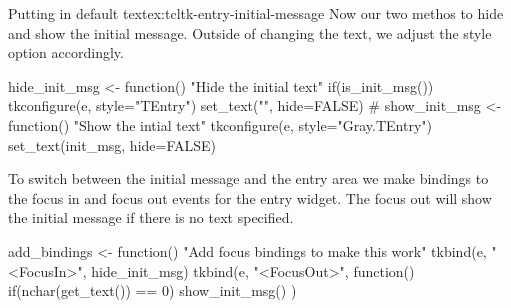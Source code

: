 \begin{example}{Putting in default text}{ex:tcltk-entry-initial-message}
Now our two methos to hide and show the initial message. Outside of
changing the text, we adjust the style option accordingly.
\begin{Schunk}
\begin{Sinput}
 hide_init_msg <- function() {
   "Hide the initial text"
   if(is_init_msg()) {
     tkconfigure(e, style="TEntry")
     set_text("", hide=FALSE)
   }
 }
 #
 show_init_msg <- function() {
   "Show the intial text"
   tkconfigure(e, style="Gray.TEntry")
   set_text(init_msg, hide=FALSE)
 }
\end{Sinput}
\end{Schunk}

To switch between the initial message and the entry area we make
bindings to the focus in and focus out events for the entry
widget. The focus out will show the initial message if there is no
text specified.

\begin{Schunk}
\begin{Sinput}
 add_bindings <- function() {
   "Add focus bindings to make this work"
   tkbind(e, "<FocusIn>", hide_init_msg)
   tkbind(e, "<FocusOut>", function() {
     if(nchar(get_text()) == 0)
       show_init_msg()
   })
 }
\end{Sinput}
\end{Schunk}


\end{example}
